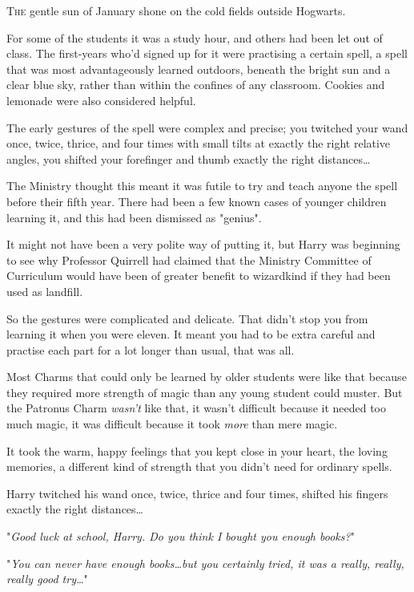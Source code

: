 
\lettrine{T}{he} gentle sun of
January shone on the cold fields outside Hogwarts.

For some of the students it was a study hour, and others had been let out of
class. The first-years who'd signed up for it were practising a certain spell,
a spell that was most advantageously learned outdoors, beneath the bright sun
and a clear blue sky, rather than within the confines of any classroom. Cookies
and lemonade were also considered helpful.

The early gestures of the spell were complex and precise; you twitched your
wand once, twice, thrice, and four times with small tilts at exactly the right
relative angles, you shifted your forefinger and thumb exactly the right
distances…

The Ministry thought this meant it was futile to try and teach anyone the spell
before their fifth year. There had been a few known cases of younger children
learning it, and this had been dismissed as "genius".

It might not have been a very polite way of putting it, but Harry was beginning
to see why Professor Quirrell had claimed that the Ministry Committee of
Curriculum would have been of greater benefit to wizardkind if they had been
used as landfill.

So the gestures were complicated and delicate. That didn't stop you from
learning it when you were eleven. It meant you had to be extra careful and
practise each part for a lot longer than usual, that was all.

Most Charms that could only be learned by older students were like that because
they required more strength of magic than any young student could muster. But
the Patronus Charm \emph{wasn't} like that, it wasn't difficult because it
needed too much magic, it was difficult because it took \emph{more} than mere
magic.

It took the warm, happy feelings that you kept close in your heart, the loving
memories, a different kind of strength that you didn't need for ordinary spells.

Harry twitched his wand once, twice, thrice and four times, shifted his fingers
exactly the right distances…

"\emph{Good luck at school, Harry. Do you think I bought you enough books?}"

"\emph{You can never have enough books…but you certainly tried, it was
a really, really, really good try…}"

